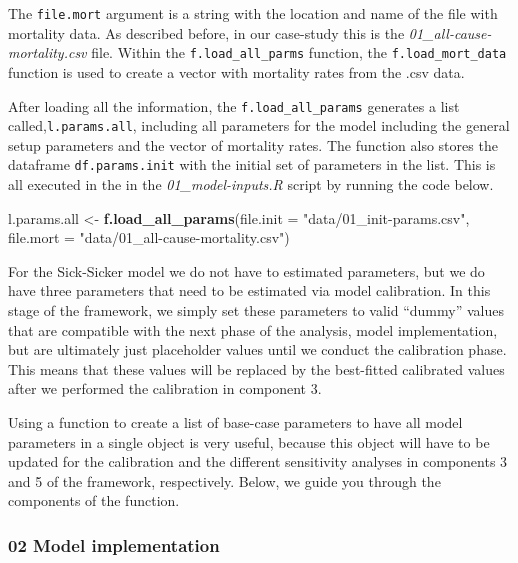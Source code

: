 \documentclass[]{article}
\newenvironment{Shaded}{\begin{snugshade}}{\end{snugshade}}
\newcommand{\KeywordTok}[1]{\textcolor[rgb]{0.13,0.29,0.53}{\textbf{#1}}}
\newcommand{\DataTypeTok}[1]{\textcolor[rgb]{0.13,0.29,0.53}{#1}}
\newcommand{\StringTok}[1]{\textcolor[rgb]{0.31,0.60,0.02}{#1}}
\newcommand{\NormalTok}[1]{#1}
\begin{document}
The \texttt{file.mort} argument is a string with the location and name
of the file with mortality data. As described before, in our case-study
this is the \emph{01\_all-cause-mortality.csv} file. Within the
\texttt{f.load\_all\_parms} function, the \texttt{f.load\_mort\_data}
function is used to create a vector with mortality rates from the .csv
data.

After loading all the information, the \texttt{f.load\_all\_params}
generates a list called,\texttt{l.params.all}, including all parameters
for the model including the general setup parameters and the vector of
mortality rates. The function also stores the dataframe
\texttt{df.params.init} with the initial set of parameters in the list.
This is all executed in the in the \emph{01\_model-inputs.R} script by
running the code below.

\begin{Shaded}
\begin{Highlighting}[]
\NormalTok{l.params.all <-}\StringTok{ }\KeywordTok{f.load_all_params}\NormalTok{(}\DataTypeTok{file.init =} \StringTok{"data/01_init-params.csv"}\NormalTok{,}
                                  \DataTypeTok{file.mort =} \StringTok{"data/01_all-cause-mortality.csv"}\NormalTok{)}
\end{Highlighting}
\end{Shaded}

For the Sick-Sicker model we do not have to estimated parameters, but we
do have three parameters that need to be estimated via model
calibration. In this stage of the framework, we simply set these
parameters to valid ``dummy'' values that are compatible with the next
phase of the analysis, model implementation, but are ultimately just
placeholder values until we conduct the calibration phase. This means
that these values will be replaced by the best-fitted calibrated values
after we performed the calibration in component 3.

Using a function to create a list of base-case parameters to have all
model parameters in a single object is very useful, because this object
will have to be updated for the calibration and the different
sensitivity analyses in components 3 and 5 of the framework,
respectively. Below, we guide you through the components of the
function.

\subsubsection{02 Model implementation}\label{model-implementation}
\end{document}
